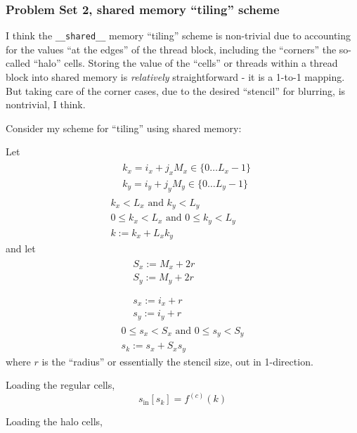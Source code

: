 \documentclass[10pt]{amsart}
\begin{document}
\begin{multicols*}{2}
\subsubsection{Problem Set 2, shared memory ``tiling'' scheme}

I think the \verb|__shared__| memory ``tiling'' scheme is non-trivial due to accounting for the values ``at the edges'' of the thread block, including the ``corners'' the so-called ``halo'' cells.  Storing the value of the ``cells'' or threads within a thread block into shared memory is \emph{relatively} straightforward - it is a 1-to-1 mapping.  But taking care of the corner cases, due to the desired ``stencil'' for blurring, is nontrivial, I think.

Consider my scheme for ``tiling'' using shared memory:

Let
\[
\begin{gathered}
  \begin{aligned}
    & k_x = i_x + j_x M_x \in \lbrace 0 \dots L_x -1 \rbrace \\ 
    & k_y = i_y + j_y M_y \in \lbrace 0 \dots L_y -1 \rbrace 
    \end{aligned} \\
  k_x < L_x \text{ and } k_y < L_y \\
  0 \leq k_x < L_x \text{ and } 0 \leq k_y < L_y \\
  k := k_x + L_x k_y
\end{gathered}
\]
and let
\[
\begin{gathered}
  \begin{aligned}
    & S_x := M_x + 2r \\ 
    & S_y := M_y + 2r \\
    \end{aligned} \\
  \begin{aligned}
    & s_x := i_x + r \\ 
    & s_y := i_y + r
  \end{aligned} \\
  0 \leq s_x < S_x \text{ and } 0 \leq s_y < S_y \\
  s_k := s_x + S_x s_y 
\end{gathered}
\]
where $r$ is the ``radius'' or essentially the stencil size, out in 1-direction.

Loading the regular cells,
\[
s_{\text{in}}[s_k] = f^{(c)}(k)
\]

Loading the halo cells, \\


\end{multicols*}
\end{document}
